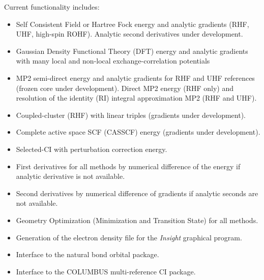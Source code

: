 \label{sec:functionality}

Current functionality includes:
\begin{itemize}
\item Self Consistent Field or Hartree Fock energy and analytic
  gradients (RHF, UHF, high-spin ROHF).  Analytic second derivatives
  under development.
\item Gaussian Density Functional Theory (DFT) energy and analytic
  gradients with many local and non-local exchange-correlation potentials
\item MP2 semi-direct energy and analytic gradients for RHF and UHF
  references (frozen core under development).  Direct MP2 energy (RHF
  only) and resolution of the identity (RI) integral approximation MP2
  (RHF and UHF).
\item Coupled-cluster (RHF) with linear triples (gradients under
  development).
\item Complete active space SCF (CASSCF) energy (gradients under
  development).
\item Selected-CI with perturbation correction energy.
\item First derivatives for all methods by numerical difference of the
  energy if analytic derivative is not available.
\item Second derivatives by numerical difference of gradients if
  analytic seconds are not available.
\item Geometry Optimization (Minimization and Transition State) for
  all methods.
\item Generation of the electron density file for the {\em Insight}
      graphical program.
\item Interface to the natural bond orbital package.
\item Interface to the COLUMBUS multi-reference CI package.
\end{itemize}
